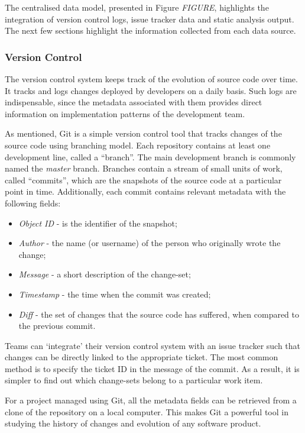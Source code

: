 \documentclass{mpaper}
\begin{document}
The centralised data model, presented in Figure \emph{FIGURE}, highlights the
integration of version control logs, issue tracker data and static analysis
output. The next few sections highlight the information collected from each data
source.

\subsubsection*{Version Control}
\label{version-control}

The version control system keeps track of the evolution of source code over
time. It tracks and logs changes deployed by developers on a daily basis. Such
logs are indispensable, since the metadata associated with them provides direct
information on implementation patterns of the development team.

As mentioned, Git is a simple version control tool that tracks changes of the
source code using branching model. Each repository contains at least one
development line, called a ``branch''. The main development branch is commonly
named the \emph{master} branch. Branches contain a stream of small units of
work, called ``commits'', which are the snapshots of the source code at a
particular point in time. Additionally, each commit contains relevant metadata
with the following fields:

\begin{itemize}
  \item \emph{Object ID} - is the identifier of the snapshot;
  \item \emph{Author} - the name (or username) of the person who originally
  wrote the change;
  \item \emph{Message} - a short description of the change-set;
  \item \emph{Timestamp} - the time when the commit was created;
  \item \emph{Diff} - the set of changes that the source code has suffered, when
  compared to the previous commit. 
\end{itemize}

Teams can `integrate' their version control system with an issue tracker such
that changes can be directly linked to the appropriate ticket. The most common
method is to specify the ticket ID in the message of the commit. As a result, it
is simpler to find out which change-sets belong to a particular work item. 

For a project managed using Git, all the metadata fields can be retrieved from a
clone of the repository on a local computer. This makes Git a powerful tool in
studying the history of changes and evolution of any software product.
\end{document}
